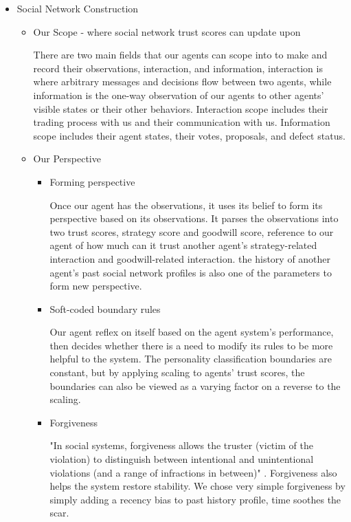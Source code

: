 \begin{itemize}
\begin{flushleft}
    \end{flushleft}
\item Social Network Construction
    \begin{itemize}
        \item 	Our Scope - where social network trust scores can update upon
            \begin{flushleft}
            \setlength{\parindent}{2em}
            There are two main fields that our agents can scope into to make and record their observations, interaction, and information, interaction is where arbitrary messages and decisions flow between two agents, while information is the one-way observation of our agents to other agents' visible states or their other behaviors. Interaction scope includes their trading process with us and their communication with us. Information scope includes their agent states, their votes, proposals, and defect status. 
            \end{flushleft}
        \item Our Perspective           
            \begin{itemize}
                \item Forming perspective
                    \begin{flushleft}
                    \setlength{\parindent}{2em}
                    Once our agent has the observations, it uses its belief to form its perspective based on its observations. It parses the observations into two trust scores, strategy score and goodwill score, reference to our agent of how much can it trust another agent's strategy-related interaction and goodwill-related interaction. the history of another agent's past social network profiles is also one of the parameters to form new perspective.

                    \end{flushleft}
                \item Soft-coded boundary rules
                    \begin{flushleft}
                    \setlength{\parindent}{2em}
                    Our agent reflex on itself based on the agent system's performance, then decides whether there is a need to modify its rules to be more helpful to the system. The personality classification boundaries are constant, but by applying scaling to agents' trust scores, the boundaries can also be viewed as a varying factor on a reverse to the scaling. 
                    \end{flushleft}                
                \item Forgiveness
                    \begin{flushleft}
                    \setlength{\parindent}{2em}
                    "In social systems, forgiveness allows the truster (victim of the violation) to distinguish between intentional and unintentional violations (and a range of infractions in between)" \cite{pitt}. Forgiveness also helps the system restore stability. We chose very simple forgiveness by simply adding a recency bias to past history profile, time soothes the scar.


\end{flushleft}
\end{itemize}
\end{itemize}
\end{itemize}
